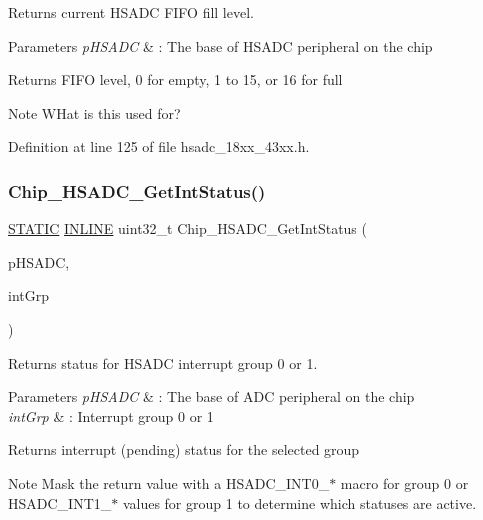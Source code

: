 Returns current H\+S\+A\+DC F\+I\+FO fill level. 


\begin{DoxyParams}{Parameters}
{\em p\+H\+S\+A\+DC} & \+: The base of H\+S\+A\+DC peripheral on the chip \\
\hline
\end{DoxyParams}
\begin{DoxyReturn}{Returns}
F\+I\+FO level, 0 for empty, 1 to 15, or 16 for full 
\end{DoxyReturn}
\begin{DoxyNote}{Note}
W\+Hat is this used for? 
\end{DoxyNote}


Definition at line 125 of file hsadc\+\_\+18xx\+\_\+43xx.\+h.

\mbox{\label{group___h_s_a_d_c__18_x_x__43_x_x_gabbda546278f45c736514ca6491a7c3fd}} 
\subsubsection{\texorpdfstring{Chip\+\_\+\+H\+S\+A\+D\+C\+\_\+\+Get\+Int\+Status()}{Chip\_HSADC\_GetIntStatus()}}
{\footnotesize\ttfamily \hyperlink{group___l_p_c___types___public___macros_ga10b2d890d871e1489bb02b7e70d9bdfb}{S\+T\+A\+T\+IC} \hyperlink{spifi__18xx__43xx_8h_a2eb6f9e0395b47b8d5e3eeae4fe0c116}{I\+N\+L\+I\+NE} uint32\+\_\+t Chip\+\_\+\+H\+S\+A\+D\+C\+\_\+\+Get\+Int\+Status (\begin{DoxyParamCaption}\item[{\hyperlink{struct_l_p_c___h_s_a_d_c___t}{L\+P\+C\+\_\+\+H\+S\+A\+D\+C\+\_\+T} $\ast$}]{p\+H\+S\+A\+DC,  }\item[{uint8\+\_\+t}]{int\+Grp }\end{DoxyParamCaption})}



Returns status for H\+S\+A\+DC interrupt group 0 or 1. 


\begin{DoxyParams}{Parameters}
{\em p\+H\+S\+A\+DC} & \+: The base of A\+DC peripheral on the chip \\
\hline
{\em int\+Grp} & \+: Interrupt group 0 or 1 \\
\hline
\end{DoxyParams}
\begin{DoxyReturn}{Returns}
interrupt (pending) status for the selected group 
\end{DoxyReturn}
\begin{DoxyNote}{Note}
Mask the return value with a H\+S\+A\+D\+C\+\_\+\+I\+N\+T0\+\_\+$\ast$ macro for group 0 or H\+S\+A\+D\+C\+\_\+\+I\+N\+T1\+\_\+$\ast$ values for group 1 to determine which statuses are active. 
\end{DoxyNote}


